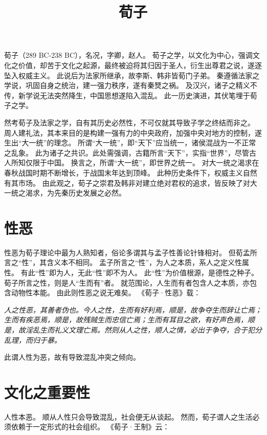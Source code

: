 \documentclass[11pt]{article}
\title{荀子}
\date{}
\begin{document}
  \maketitle
  
  \newpage

  \linenumbers
  
荀子（289 BC-238 BC），名况，字卿，赵人。
荀子之学，以文化为中心，强调文化之价值，却苦于文化之起源，最终被迫将其归因于圣人，衍生出尊君之说，遂逐坠入权威主义。
此说后为法家所继承，故李斯、韩非皆荀门子弟。
秦遵循法家之学说，巩固自身之统治，建一强力秩序，遂有秦燹之祸。
及汉兴，诸子之精义不传，新学说无法突然降生，中国思想遂陷入混乱。
此一历史演进，其伏笔埋于荀子之学。

\newline

然考荀子及法家之学，自有其历史必然性，不可仅就其导致子学之终结而非之。
周人建礼法，其本来目的是构建一强有力的中央政府，加强中央对地方的控制，遂生出“大一统”的理念。
所谓“大一统”，即“天下”应当统一，诸侯混战为一不正常之乱象。
此为诸子之共识。此处需强调，古籍所言“天下”，实指“世界”，尽管古人所知仅限于中国。
换言之，所谓“大一统”，即世界之统一。
对大一统之渴求在春秋战国时期不断增长，于战国末年达到顶峰。
此种历史条件下，权威主义自然有其市场。
由此观之，荀子之崇君及韩非对建立绝对君权的追求，皆反映了对大一统之渴求，为先秦历史发展之必然。

\section{性恶}
性恶为荀子理论中最为人熟知者，俗论多谓其与孟子性善论针锋相对。
但荀孟所言之“性”，其含义本不相同。
孟子所言之“性”，为人之本质，系人之定义性属性。
有此“性”即为人，无此“性”即不为人。
此“性”为价值根源，是德性之种子。
荀子所言之性，则是人“生而有”者。
就范围论，人生而有者包含人之本质，亦包含动物性本能。
由此则性恶之说无难矣。
《荀子·性恶》载：

\textit{人之性恶，其善者伪也。今人之性，生而有好利焉，顺是，故争夺生而辞让亡焉；生而有疾恶焉，顺是，故残贼生而忠信亡焉；生而有耳目之欲，有好声色焉，顺是，故淫乱生而礼义文理亡焉。然则从人之性，顺人之情，必出于争夺，合于犯分乱理，而归于暴。}

此谓人性为恶，故有导致混乱冲突之倾向。

\section{文化之重要性}
人性本恶。
顺从人性只会导致混乱，社会便无从谈起。
然而，荀子谓人之生活必须依赖于一定形式的社会组织。
《荀子·王制》云：
\end{document}
